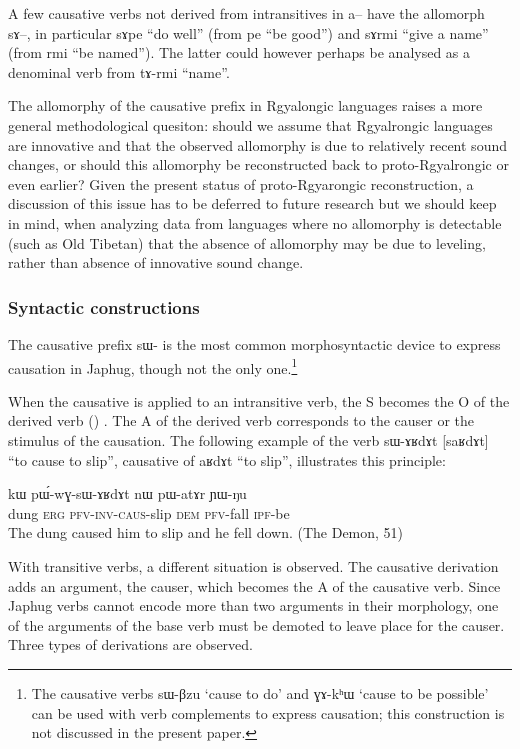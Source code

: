 \documentclass[oldfontcommands,oneside,a4paper,11pt]{article}
\newcommand{\ipa}[1]{{\phon \mbox{#1}}} %
\newcommand{\pfv}{\textsc{pfv}}
\newcommand{\caus}{\textsc{caus}}
\newcommand{\dem}{\textsc{dem}}
\newcommand{\erg}{\textsc{erg}}
\newcommand{\inv}{\textsc{inv}}
\newcommand{\ipf}{\textsc{ipf}}
\begin{document}
A few causative verbs not derived from intransitives in \ipa{a}-- have the allomorph \ipa{sɤ}--, in particular \ipa{sɤpe} ``do well'' (from \ipa{pe} ``be good'') and \ipa{sɤrmi} ``give a name'' (from \ipa{rmi} ``be named''). The latter could however perhaps be analysed as a denominal verb from \ipa{tɤ-rmi} ``name''.

The allomorphy of the causative prefix in Rgyalongic languages raises a more general methodological quesiton: should we assume that Rgyalrongic languages are innovative and that the observed allomorphy is due to relatively recent sound changes, or should this allomorphy be reconstructed back to proto-Rgyalrongic or even earlier? Given the present status of proto-Rgyarongic reconstruction, a discussion of this issue has to be deferred to future research but we should keep in mind, when analyzing data from languages where no allomorphy is detectable (such as Old Tibetan) that the absence of allomorphy may be due to leveling, rather than absence of innovative sound change.

\subsubsection{Syntactic constructions} \label{subsub:causation}
The causative prefix \ipa{sɯ-} is the most common morphosyntactic device to express causation in Japhug, though not the only one.\footnote{The causative verbs \ipa{sɯ-βzu} `cause to do' and \ipa{ɣɤ-kʰɯ} `cause to be possible' can be used with verb complements to express causation; this construction is not discussed in the present paper. }

When the causative is applied to an intransitive verb, the S becomes the O of the derived verb (\citealt[45]{dixon00causative}) . The A of the derived verb corresponds to the causer  or the stimulus of the causation.  The following example of the verb \ipa{sɯ-ɤʁdɤt} [\ipa{saʁdɤt}] ``to cause to slip'', causative of \ipa{aʁdɤt} ``to slip'', illustrates this principle:
\begin{exe}
\ex
\gll \ipa{tɯqe} 	\ipa{kɯ} 	\ipa{pɯ́-wɣ-sɯ-ɤʁdɤt} 	\ipa{nɯ} 	\ipa{pɯ-atɤr} 	\ipa{ɲɯ-ŋu} \\
dung \erg{} \pfv{}-\inv{}-\caus{}-slip \dem{} \pfv{}-fall \ipf{}-be \\
 \glt The dung caused him to slip and he fell down. (The Demon, 51)
\end{exe} 


With transitive verbs, a different situation is observed. The causative derivation adds an argument, the causer, which becomes the A of the causative verb. Since Japhug verbs cannot encode more than two arguments in their morphology, one of the arguments of the base verb must be demoted to leave place for the causer.  Three types of derivations are observed.
\end{document}

